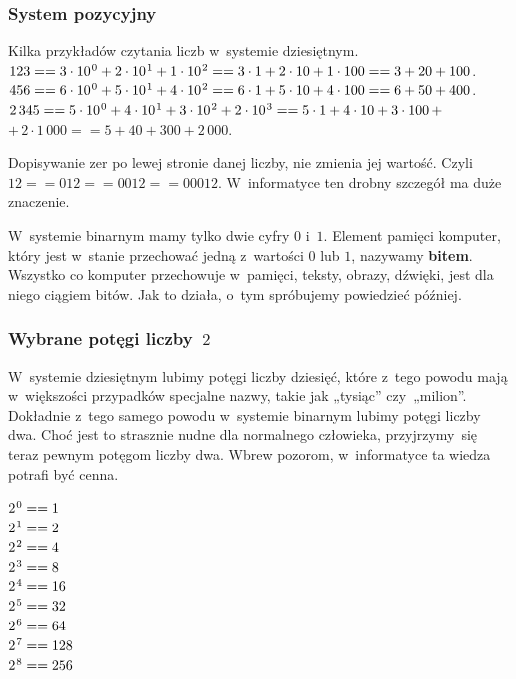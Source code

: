 \documentclass[10pt,t]{beamer}
\begin{document}
\begin{frame}
  \frametitle{System pozycyjny}


  Kilka przykładów czytania liczb w~systemie dziesiętnym. \\
  $123 == 3 \cdot 10^{ \hspace{0.07em} 0 } + 2 \cdot 10^{ \hspace{0.07em} 1 } +
  1 \cdot 10^{ \hspace{0.07em} 2 } == 3 \cdot 1 + 2 \cdot 10 + 1 \cdot 100 == 3 + 20 + 100$. \\
  $456 == 6 \cdot 10^{ \hspace{0.07em} 0 } + 5 \cdot 10^{ \hspace{0.07em} 1 } +
  4 \cdot 10^{ \hspace{0.07em} 2 } == 6 \cdot 1 + 5 \cdot 10 + 4 \cdot 100 == 6 + 50 + 400$. \\
  $2 \, 345 == 5 \cdot 10^{ \hspace{0.07em} 0 } + 4 \cdot 10^{ \hspace{0.07em} 1 } +
  3 \cdot 10^{ \hspace{0.07em} 2 } + 2 \cdot 10^{ \hspace{0.07em} 3 } == 5 \cdot 1 + 4 \cdot 10 +
  3 \cdot 100 \, +$ \\
  $+ \, 2 \cdot 1 \, 000 == 5 + 40 + 300 + 2 \, 000$.

  Dopisywanie zer po lewej stronie danej liczby, nie zmienia jej wartość.
  Czyli $12 == 012 == 0012 == 00012$. W~informatyce ten drobny szczegół
  ma duże znaczenie.

  W~systemie binarnym mamy tylko dwie cyfry $0$ i~$1$. Element pamięci
  komputer, który jest w~stanie przechować jedną z~wartości $0$ lub $1$,
  nazywamy \textbf{bitem}. Wszystko co komputer przechowuje w~pamięci,
  teksty, obrazy, dźwięki, jest dla niego ciągiem bitów. Jak to działa,
  o~tym spróbujemy powiedzieć później.

\end{frame}





\begin{frame}
  \frametitle{Wybrane potęgi liczby~$2$}


  W~systemie dziesiętnym lubimy potęgi liczby dziesięć, które z~tego powodu
  mają w~większości przypadków specjalne nazwy, takie jak „tysiąc”
  czy~„milion”. Dokładnie z~tego samego powodu w~systemie binarnym lubimy
  potęgi liczby dwa. Choć jest to strasznie nudne dla normalnego człowieka,
  przyjrzymy~się teraz pewnym potęgom liczby dwa. Wbrew pozorom,
  w~informatyce ta wiedza potrafi być cenna.

  $2^{ \hspace{0.07em} 0 } == 1$ \\[0.1em]
  $2^{ \hspace{0.07em} 1 } == 2$ \\[0.1em]
  $2^{ \hspace{0.07em} 2 } == 4$ \\[0.1em]
  $2^{ \hspace{0.07em} 3 } == 8$ \\[0.1em]
  $2^{ \hspace{0.07em} 4 } == 16$ \\[0.1em]
  $2^{ \hspace{0.07em} 5 } == 32$ \\[0.1em]
  $2^{ \hspace{0.07em} 6 } == 64$ \\[0.1em]
  $2^{ \hspace{0.07em} 7 } == 128$ \\[0.1em]
  $2^{ \hspace{0.07em} 8 } == 256$

\end{frame}
\end{document}
